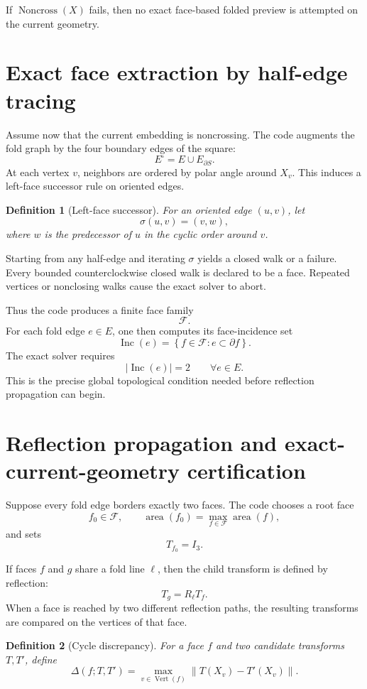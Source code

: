 \documentclass[11pt]{article}
\newtheorem{definition}{Definition}[section]
\theoremstyle{remark}
\newcommand{\norm}[1]{\left\lVert #1 \right\rVert}
\newcommand{\abs}[1]{\left\lvert #1 \right\rvert}
\newcommand{\set}[1]{\left\{ #1 \right\}}
\begin{document}
If $\operatorname{Noncross}(X)$ fails, then no exact face-based folded preview
is attempted on the current geometry.

\section{Exact face extraction by half-edge tracing}

Assume now that the current embedding is noncrossing. The code augments the fold
graph by the four boundary edges of the square:
\[
E^\square = E \cup E_{\partial S}.
\]
At each vertex $v$, neighbors are ordered by polar angle around $X_v$. This
induces a left-face successor rule on oriented edges.

\begin{definition}[Left-face successor]
For an oriented edge $(u,v)$, let
\[
\sigma(u,v)=(v,w),
\]
where $w$ is the predecessor of $u$ in the cyclic order around $v$.
\end{definition}

Starting from any half-edge and iterating $\sigma$ yields a closed walk or a
failure. Every bounded counterclockwise closed walk is declared to be a face.
Repeated vertices or nonclosing walks cause the exact solver to abort.

Thus the code produces a finite face family
\[
\mathcal F.
\]
For each fold edge $e\in E$, one then computes its face-incidence set
\[
\operatorname{Inc}(e)=\set{f\in\mathcal F:e\subset\partial f}.
\]
The exact solver requires
\[
\abs{\operatorname{Inc}(e)}=2
\qquad
\forall e\in E.
\]
This is the precise global topological condition needed before reflection
propagation can begin.

\section{Reflection propagation and exact-current-geometry certification}

Suppose every fold edge borders exactly two faces. The code chooses a root face
\[
f_0\in\mathcal F,
\qquad
\operatorname{area}(f_0)=\max_{f\in\mathcal F}\operatorname{area}(f),
\]
and sets
\[
T_{f_0}=I_3.
\]

If faces $f$ and $g$ share a fold line $\ell$, then the child transform is
defined by reflection:
\[
T_g = R_\ell T_f.
\]
When a face is reached by two different reflection paths, the resulting
transforms are compared on the vertices of that face.

\begin{definition}[Cycle discrepancy]
For a face $f$ and two candidate transforms $T,T'$, define
\[
\Delta(f;T,T')
=
\max_{v\in \operatorname{Vert}(f)}
\norm{T(X_v)-T'(X_v)}.
\]
\end{definition}
\end{document}
